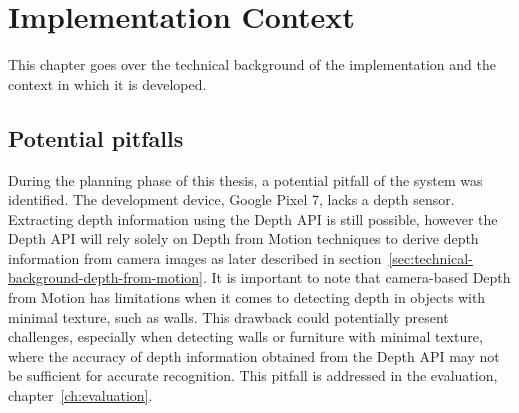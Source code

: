\chapter{Implementation Context}

This chapter goes over the technical background of the implementation and the context in which it is developed.



%
%
%


\section{Potential pitfalls}
During the planning phase of this thesis, a potential pitfall of the system was identified.
The development device, Google Pixel 7, lacks a depth sensor.
Extracting depth information using the Depth API is still possible, however
the Depth API will rely solely on Depth from Motion techniques to derive depth information from camera
images as later described in section~\ref{sec:technical-background-depth-from-motion}.
It is important to note that camera-based Depth from Motion has limitations
when it comes to detecting depth in objects with minimal texture, such as walls.
This drawback could potentially present challenges, especially when detecting walls or furniture with minimal texture,
where the accuracy of depth information obtained from the Depth API may not be sufficient for accurate recognition. \parencite{google_llc_arcore_doc}
This pitfall is addressed in the evaluation, chapter~\ref{ch:evaluation}.

